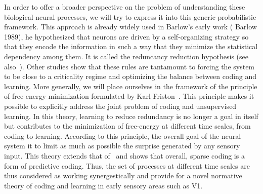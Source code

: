 \documentclass[a4paper, 11pt, draft]{article} %
\begin{document}
In order to offer a broader perspective on the problem of understanding these biological neural processes, we will try to express it into this generic probabilistic framework.
This approach is already widely used in Barlow's early work ( Barlow 1989), he hypothesized that neurons are driven by a self-organizing strategy so that they encode the information in such a way that they minimize the statistical dependency among them. It is called the reduncancy reduction hypothesis (see also~\citep{Atick92}). %
Other studies show that these rules are tantamount to forcing the system to be close to a criticality regime and optimizing the balance between coding and learning. %
More generally, we will place ourselves in the framework of the principle of free-energy minimization formulated by Karl Friston~\citep{Friston12}. This principle makes it possible to explicitly address the joint problem of coding and unsupervised learning. In this theory, learning to reduce redundancy is no longer a goal in itself but contributes to the minimization of free-energy at different time scales, from coding to learning. %
According to this principle, the overall goal of the neural system it to limit as much as possible the surprise generated by any sensory input.
This theory extends that of~\citep{Olshausen97} and shows that overall, sparse coding is a form of predictive coding. Thus, the set of processes at different time scales are thus considered as working synergestically and provide for a novel normative theory of coding and learning in early sensory areas such as V1.
\end{document}
